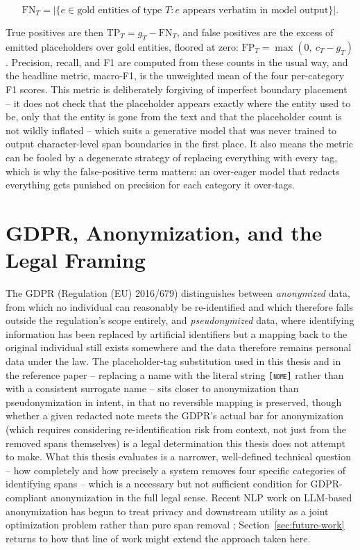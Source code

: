 \documentclass[12pt,a4paper]{report}
\newcommand{\NOME}{\textsc{nome}}
\begin{document}
\[
\text{FN}_T = |\{ e \in \text{gold entities of type } T : e \text{ appears verbatim in model output} \}|.
\]

True positives are then $\text{TP}_T = g_T - \text{FN}_T$, and false positives are the excess of emitted placeholders over gold entities, floored at zero: $\text{FP}_T = \max(0,\ c_T - g_T)$. Precision, recall, and F1 are computed from these counts in the usual way, and the headline metric, macro-F1, is the unweighted mean of the four per-category F1 scores. This metric is deliberately forgiving of imperfect boundary placement -- it does not check that the placeholder appears exactly where the entity used to be, only that the entity is gone from the text and that the placeholder count is not wildly inflated -- which suits a generative model that was never trained to output character-level span boundaries in the first place. It also means the metric can be fooled by a degenerate strategy of replacing everything with every tag, which is why the false-positive term matters: an over-eager model that redacts everything gets punished on precision for each category it over-tags.

\section{GDPR, Anonymization, and the Legal Framing}

The GDPR (Regulation (EU) 2016/679) distinguishes between \emph{anonymized} data, from which no individual can reasonably be re-identified and which therefore falls outside the regulation's scope entirely, and \emph{pseudonymized} data, where identifying information has been replaced by artificial identifiers but a mapping back to the original individual still exists somewhere and the data therefore remains personal data under the law. The placeholder-tag substitution used in this thesis and in the reference paper -- replacing a name with the literal string \texttt{[\NOME{}]} rather than with a consistent surrogate name -- sits closer to anonymization than pseudonymization in intent, in that no reversible mapping is preserved, though whether a given redacted note meets the GDPR's actual bar for anonymization (which requires considering re-identification risk from context, not just from the removed spans themselves) is a legal determination this thesis does not attempt to make. What this thesis evaluates is a narrower, well-defined technical question -- how completely and how precisely a system removes four specific categories of identifying spans -- which is a necessary but not sufficient condition for GDPR-compliant anonymization in the full legal sense. Recent NLP work on LLM-based anonymization has begun to treat privacy and downstream utility as a joint optimization problem rather than pure span removal \citep{yang2025rupta}; Section~\ref{sec:future-work} returns to how that line of work might extend the approach taken here.
\end{document}
